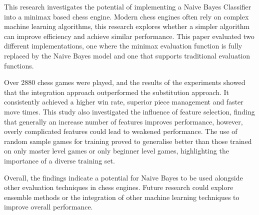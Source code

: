 This research investigates the potential of implementing a Naive Bayes Classifier into a minimax based chess engine. Modern chess engines often rely on complex machine learning algorithms, this research explores whether a simpler algorithm can improve efficiency and achieve similar performance. This paper evaluated two different implementations, one where the minimax evaluation function is fully replaced by the Naive Bayes model and one that supports traditional evaluation functions. 

Over 2880 chess games were played, and the results of the experiments showed that the integration approach outperformed the substitution approach. It consistently achieved a higher win rate, superior piece management and faster move times. This study also investigated the influence of feature selection, finding that generally an increase number of features improves performance, however, overly complicated features could lead to weakened performance. The use of random sample games for training proved to generalise better than those trained on only master level games or only beginner level games, highlighting the importance of a diverse training set. 

Overall, the findings indicate a potential for Naive Bayes to be used alongside other evaluation techniques in chess engines. Future research could explore ensemble methods or the integration of other machine learning techniques to improve overall performance.